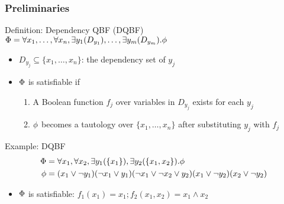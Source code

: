 \begin{frame}
  \frametitle{Preliminaries}
  \begin{block}{Definition: Dependency QBF (DQBF)}
    $\Phi=\forall x_1, \ldots, \forall x_n, \exists y_1(D_{y_1}), \ldots, \exists y_m(D_{y_m}).\phi$
    \begin{itemize}
      \item $D_{y_j} \subseteq \{x_1,\ldots,x_n\}$: the \alert{dependency set} of $y_j$
      \item $\Phi$ is satisfiable if
            \begin{enumerate}
              \item A Boolean function $f_j$ over variables in $D_{y_j}$ exists for each $y_j$
              \item $\phi$ becomes a tautology over $\{x_1,\ldots,x_n\}$ after substituting $y_j$ with $f_j$
            \end{enumerate}
    \end{itemize}
  \end{block}
  \pause
  \begin{block}{Example: DQBF}
    \abovedisplayskip=0pt
    \belowdisplayskip=0pt
    \begin{align*}
      \Phi & = \forall x_1,\forall x_2,\exists y_1(\{x_1\}),\exists y_2(\{x_1,x_2\}).\phi \\
      \phi & = (x_1 \lor \lnot y_1)
      (\lnot x_1 \lor y_1)
      (\lnot x_1 \lor \lnot x_2 \lor y_2)
      (x_1 \lor \lnot y_2)
      (x_2 \lor \lnot y_2)
    \end{align*}
    \begin{itemize}
      \item $\Phi$ is satisfiable: $f_1(x_1)=x_1;f_2(x_1,x_2)=x_1 \land x_2$
    \end{itemize}
  \end{block}
\end{frame}